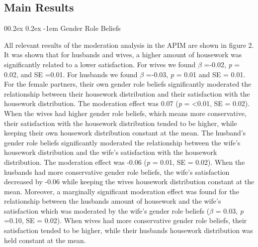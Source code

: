 \documentclass[
  man,floatsintext]{apa6}
\makeatletter
\let\oldparagraph\paragraph
\renewcommand{\paragraph}[1]{\oldparagraph{#1}\mbox{}}
\renewcommand{\paragraph}{\@startsection{paragraph}{4}{\parindent}%
  {0\baselineskip \@plus 0.2ex \@minus 0.2ex}%
  {-1em}%
  {\normalfont\normalsize\bfseries\itshape\typesectitle}}
\makeatother
\begin{document}
\hypertarget{main-results}{%
\subsection{Main Results}\label{main-results}}

\hypertarget{gender-role-beliefs-1}{%
\paragraph{Gender Role Beliefs}\label{gender-role-beliefs-1}}

All relevant results of the moderation analysis in the APIM are shown in figure 2. It was shown that for husbands and wives, a higher amount of housework was significantly related to a lower satisfaction. For wives we found \(\beta\) =-0.02, \emph{p} = 0.02, and SE =0.01. For husbands we found \(\beta\) =-0.03, \emph{p} = 0.01 and SE = 0.01.
For the female partners, their own gender role beliefs significantly moderated the relationship between their housework distribution and their satisfaction with the housework distribution. The moderation effect was 0.07 (\emph{p} = \textless0.01, SE = 0.02). When the wives had higher gender role beliefs, which means more conservative, their satisfaction with the housework distribution tended to be higher, while keeping their own housework distribution constant at the mean. The husband's gender role beliefs significantly moderated the relationship between the wife's housework distribution and the wife's satisfaction with the housework distribution. The moderation effect was -0.06 (\emph{p} = 0.01, SE = 0.02). When the husbands had more conservative gender role beliefs, the wife's satisfaction decreased by -0.06 while keeping the wives housework distribution constant at the mean. Moreover, a marginally significant moderation effect was found for the relationship between the husbands amount of housework and the wife's satisfaction which was moderated by the wife's gender role beliefs (\(\beta\) = 0.03, \emph{p} =0.10, SE = 0.02). When wives had more conservative gender role beliefs, their satisfaction tended to be higher, while their husbands housework distribution was held constant at the mean.
\end{document}
